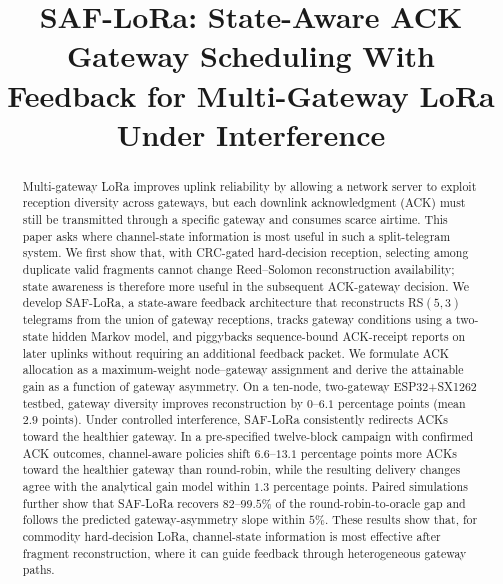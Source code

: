 \documentclass[journal]{IEEEtran}
\newcommand{\authorfill}[1]{\textbf{\textcolor{red}{[#1]}}}
\begin{document}
\title{SAF-LoRa: State-Aware ACK Gateway Scheduling With Feedback for Multi-Gateway LoRa Under Interference}

\author{
\IEEEauthorblockN{\authorfill{Author name(s)}}
\IEEEauthorblockA{\authorfill{Department / Institute}}
}

\maketitle

\begin{abstract}
Multi-gateway LoRa improves uplink reliability by allowing a network server to exploit reception diversity across gateways, but each downlink acknowledgment (ACK) must still be transmitted through a specific gateway and consumes scarce airtime. This paper asks where channel-state information is most useful in such a split-telegram system. We first show that, with CRC-gated hard-decision reception, selecting among duplicate valid fragments cannot change Reed--Solomon reconstruction availability; state awareness is therefore more useful in the subsequent ACK-gateway decision. We develop SAF-LoRa, a state-aware feedback architecture that reconstructs RS$(5,3)$ telegrams from the union of gateway receptions, tracks gateway conditions using a two-state hidden Markov model, and piggybacks sequence-bound ACK-receipt reports on later uplinks without requiring an additional feedback packet. We formulate ACK allocation as a maximum-weight node--gateway assignment and derive the attainable gain as a function of gateway asymmetry. On a ten-node, two-gateway ESP32+SX1262 testbed, gateway diversity improves reconstruction by $0$--$6.1$ percentage points (mean $2.9$ points). Under controlled interference, SAF-LoRa consistently redirects ACKs toward the healthier gateway. In a pre-specified twelve-block campaign with confirmed ACK outcomes, channel-aware policies shift $6.6$--$13.1$ percentage points more ACKs toward the healthier gateway than round-robin, while the resulting delivery changes agree with the analytical gain model within $1.3$ percentage points. Paired simulations further show that SAF-LoRa recovers $82$--$99.5\%$ of the round-robin-to-oracle gap and follows the predicted gateway-asymmetry slope within $5\%$. These results show that, for commodity hard-decision LoRa, channel-state information is most effective after fragment reconstruction, where it can guide feedback through heterogeneous gateway paths.
\end{abstract}
\end{document}
